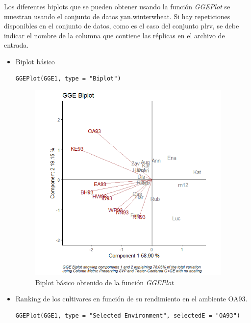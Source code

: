 Los diferentes biplots que se pueden obtener usando la función \emph{GGEPlot} se muestran usando el conjunto de datos yan.winterwheat. Si hay repeticiones disponibles en el conjunto de datos, como es el caso del conjunto plrv, se debe indicar el nombre de la columna que contiene las réplicas en el archivo de entrada.


\begin{itemize}
\item Biplot básico

\begin{lstlisting}
GGEPlot(GGE1, type = "Biplot")
\end{lstlisting}

\begin{figure}[H]
	\begin{center}
		\includegraphics[width=10cm]{./Graficos/GGE_BIPLOT.png}
	\end{center}
	\caption{Biplot básico obtenido de la función \emph{GGEPlot}}
\end{figure}

\item Ranking de los cultivares en función de su rendimiento en el ambiente OA93.

\begin{lstlisting}
GGEPlot(GGE1, type = "Selected Environment", selectedE = "OA93")
\end{lstlisting}



\end{itemize}
